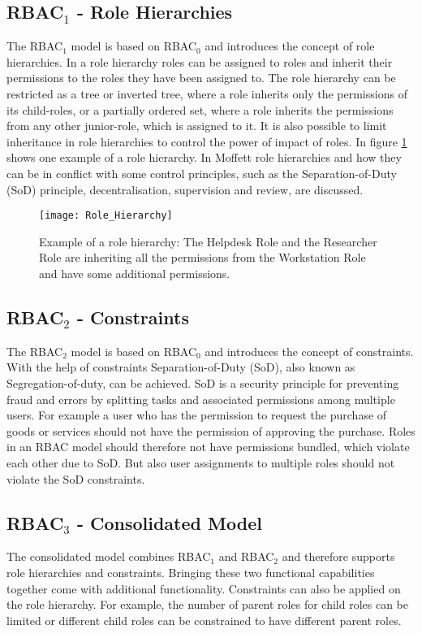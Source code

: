         \subsection{RBAC$_1$ - Role Hierarchies}
        \label{sec:rolehierarchies}
            The RBAC$_1$ model is based on RBAC$_0$ and introduces the concept of role hierarchies. In a role hierarchy roles can be assigned to roles and inherit their permissions to the roles they have been assigned to. The role hierarchy can be restricted as a tree or inverted tree, where a role inherits only the permissions of its child-roles, or a partially ordered set, where a role inherits the permissions from any other junior-role, which is assigned to it. It is also possible to limit inheritance in role hierarchies to control the power of impact of roles. In figure \ref{fig:rolehierarchies} shows one example of a role hierarchy.
            In Moffett\cite{Moffett:1998} role hierarchies and how they can be in conflict with some control principles, such as the Separation-of-Duty (SoD) principle, decentralisation, supervision and review, are discussed.
            \begin{figure}[H]
                \centering
                \texttt{[image: Role\_Hierarchy]}
                \caption{Example of a role hierarchy: The Helpdesk Role and the Researcher Role are inheriting all the permissions from the Workstation Role and have some additional permissions.}
                \label{fig:rolehierarchies}
            \end{figure}
        \subsection{RBAC$_2$ - Constraints}
        \label{sec:rbac2}
            The RBAC$_2$ model is based on RBAC$_0$ and introduces the concept of constraints. With the help of constraints Separation-of-Duty (SoD), also known as Segregation-of-duty, can be achieved. SoD is a security principle for preventing fraud and errors by splitting tasks and associated permissions among multiple users. For example a user who has the permission to request the purchase of goods or services should not have the permission of approving the purchase. Roles in an RBAC model should therefore not have permissions bundled, which violate each other due to SoD. But also user assignments to multiple roles should not violate the SoD constraints.
        \subsection{RBAC$_3$ - Consolidated Model}
            The consolidated model combines RBAC$_1$ and RBAC$_2$ and therefore supports role hierarchies and constraints. Bringing these two functional capabilities together come with additional functionality. Constraints can also be applied on the role hierarchy. For example, the number of parent roles for child roles can be limited or different child roles can be constrained to have different parent roles.
            
